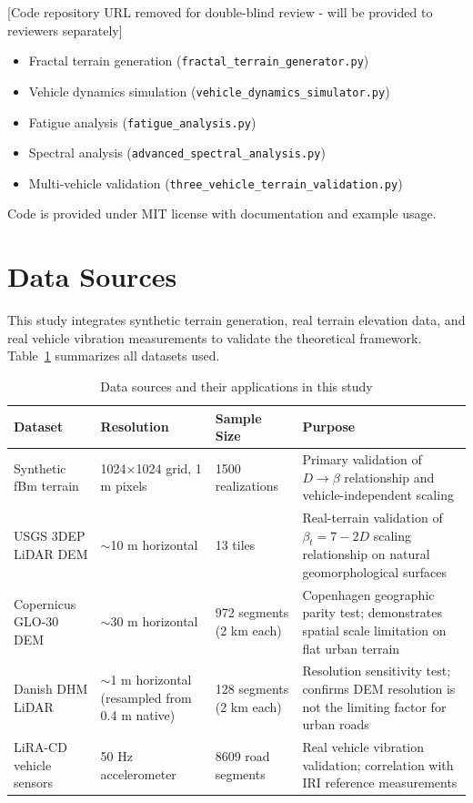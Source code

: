 \documentclass[11pt]{article}
\begin{document}
\begin{center}
[Code repository URL removed for double-blind review - will be provided to reviewers separately]
\end{center}

\begin{itemize}
\item Fractal terrain generation (\texttt{fractal\_\allowbreak terrain\_\allowbreak generator.py})
\item Vehicle dynamics simulation (\texttt{vehicle\_\allowbreak dynamics\_\allowbreak simulator.py})
\item Fatigue analysis (\texttt{fatigue\_\allowbreak analysis.py})
\item Spectral analysis (\texttt{advanced\_\allowbreak spectral\_\allowbreak analysis.py})
\item Multi-vehicle validation (\texttt{three\_\allowbreak vehicle\_\allowbreak terrain\_\allowbreak validation.py})
\end{itemize}

Code is provided under MIT license with documentation and example usage.


\section*{Data Sources}

This study integrates synthetic terrain generation, real terrain elevation data, and real vehicle vibration measurements to validate the theoretical framework. Table~\ref{tab:datasources} summarizes all datasets used.

\begin{table}[h]
\centering
\caption{Data sources and their applications in this study}
\label{tab:datasources}
\small
\begin{tabular}{p{3cm}p{2.5cm}p{2cm}p{6cm}}
\hline
\textbf{Dataset} & \textbf{Resolution} & \textbf{Sample Size} & \textbf{Purpose} \\
\hline
Synthetic fBm terrain & 1024$\times$1024 grid, 1 m pixels & 1500 realizations & Primary validation of $D \rightarrow \beta$ relationship and vehicle-independent scaling \\
\hline
USGS 3DEP LiDAR DEM & $\sim$10 m horizontal & 13 tiles & Real-terrain validation of $\beta_t = 7-2D$ scaling relationship on natural geomorphological surfaces \\
\hline
Copernicus GLO-30 DEM & $\sim$30 m horizontal & 972 segments (2 km each) & Copenhagen geographic parity test; demonstrates spatial scale limitation on flat urban terrain \\
\hline
Danish DHM LiDAR & $\sim$1 m horizontal (resampled from 0.4 m native) & 128 segments (2 km each) & Resolution sensitivity test; confirms DEM resolution is not the limiting factor for urban roads \\
\hline
LiRA-CD vehicle sensors & 50 Hz accelerometer & 8609 road segments & Real vehicle vibration validation; correlation with IRI reference measurements \\
\hline
\end{tabular}
\end{table}
\end{document}
